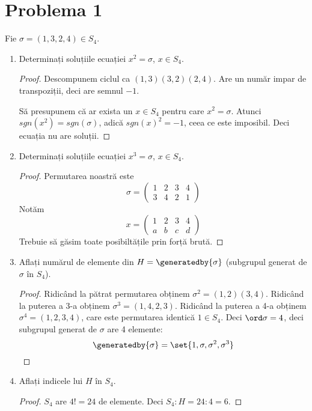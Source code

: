 \section*{Problema 1}

Fie \(\sigma = (1, 3, 2, 4) \in S_4\).

\begin{enumerate}
    \item Determinați soluțiile ecuației \(x^2 = \sigma\), \(x \in S_4\).
    \begin{proof}
    Descompunem ciclul ca \((1, 3) (3, 2) (2, 4)\). Are un număr impar de transpoziții, deci are semnul \(-1\).

    Să presupunem că ar exista un \(x \in S_4\) pentru care \(x^2 = \sigma\). Atunci \(sgn(x^2) = sgn(\sigma)\), adică \(sgn(x)^2 = -1\), ceea ce este imposibil. Deci ecuația nu are soluții.
    \end{proof}

    \item Determinați soluțiile ecuației \(x^3 = \sigma\), \(x \in S_4\).
    \begin{proof}
    Permutarea noastră este
    \[\sigma = \begin{pmatrix}
        1 & 2 & 3 & 4 \\
        3 & 4 & 2 & 1
    \end{pmatrix}\]
    Notăm
    \[x = \begin{pmatrix}
        1 & 2 & 3 & 4 \\
        a & b & c & d
    \end{pmatrix}\]
    Trebuie să găsim toate posibiltățile prin forță brută.
    \end{proof}

    \item Aflați numărul de elemente din \(H = \generatedby{\sigma}\) (subgrupul generat de \(\sigma\) în \(S_4\)).
    \begin{proof}
    Ridicând la pătrat permutarea obținem \(\sigma^2 = (1, 2) (3, 4)\). Ridicând la puterea a 3-a obținem \(\sigma^3 = (1, 4, 2, 3)\). Ridicând la puterea a 4-a obținem \(\sigma^4 = (1, 2, 3, 4)\), care este permutarea identică \(1 \in S_4\). Deci \(\ord \sigma = 4\), deci subgrupul generat de \(\sigma\) are 4 elemente:
    \[\generatedby{\sigma} = \set{1, \sigma, \sigma^2, \sigma^3}\]
    \end{proof}

    \item Aflați indicele lui \(H\) în \(S_4\).
    \begin{proof}
    \(S_4\) are \(4! = 24\) de elemente. Deci \(S_4 : H = 24 : 4 = 6\).
    \end{proof}


\end{enumerate}
